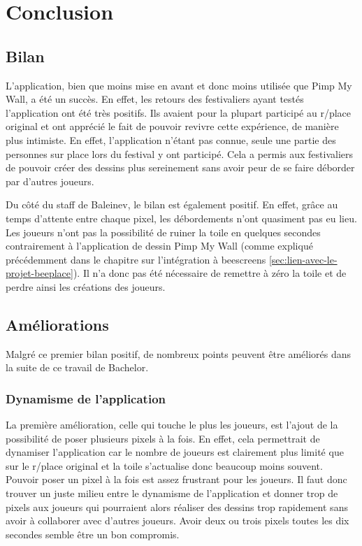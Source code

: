 \section{Conclusion}

\subsection{Bilan}

L'application, bien que moins mise en avant et donc moins utilisée que Pimp My Wall, a été un succès. En effet, les retours des festivaliers ayant testés l'application ont été très positifs. Ils avaient pour la plupart participé au r/place original et ont apprécié le fait de pouvoir revivre cette expérience, de manière plus intimiste. En effet, l'application n'étant pas connue, seule une partie des personnes sur place lors du festival y ont participé. Cela a permis aux festivaliers de pouvoir créer des dessins plus sereinement sans avoir peur de se faire déborder par d'autres joueurs.

Du côté du staff de Baleinev, le bilan est également positif. En effet, grâce au temps d'attente entre chaque pixel, les débordements n'ont quasiment pas eu lieu. Les joueurs n'ont pas la possibilité de ruiner la toile en quelques secondes contrairement à l'application de dessin Pimp My Wall (comme expliqué précédemment dans le chapitre sur l'intégration à \gls{beescreens} \ref{sec:lien-avec-le-projet-beeplace}). Il n'a donc pas été nécessaire de remettre à zéro la toile et de perdre ainsi les créations des joueurs.

\subsection{Améliorations}
\label{poc-ameliorations}

Malgré ce premier bilan positif, de nombreux points peuvent être améliorés dans la suite de ce travail de Bachelor.

\subsubsection{Dynamisme de l'application}
La première amélioration, celle qui touche le plus les joueurs, est l'ajout de la possibilité de poser plusieurs pixels à la fois. En effet, cela permettrait de dynamiser l'application car le nombre de joueurs est clairement plus limité que sur le r/place original et la toile s'actualise donc beaucoup moins souvent. Pouvoir poser un pixel à la fois est assez frustrant pour les joueurs. Il faut donc trouver un juste milieu entre le dynamisme de l'application et donner trop de pixels aux joueurs qui pourraient alors réaliser des dessins trop rapidement sans avoir à collaborer avec d'autres joueurs. Avoir deux ou trois pixels toutes les dix secondes semble être un bon compromis.

